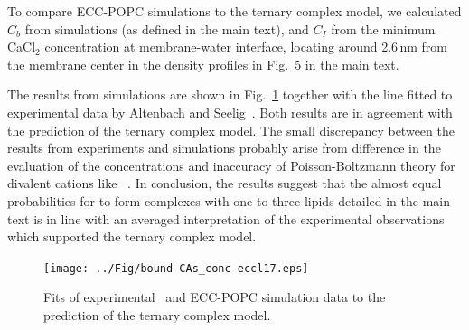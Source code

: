 \documentclass[journal=jpcbfk]{achemso}
\begin{document}
To compare ECC-POPC simulations to the ternary complex model,
we calculated $C_b$ from simulations (as defined in the main text),
and $C_I$ from the minimum CaCl$_2$ concentration at membrane-water interface,
locating around 2.6\,nm from the membrane center in
the density profiles in Fig.~5 in the main text. 

The results from simulations are shown in Fig.~\ref{fig:cacl-bind}
together with the line fitted to experimental data by Altenbach and Seelig~\cite{altenbach84}.
Both results are in agreement with the prediction of the ternary complex model.
The small discrepancy between the results from experiments and simulations probably
arise from difference in the evaluation of the concentrations and
inaccuracy of Poisson-Boltzmann theory for divalent cations like ~\cite{Andelman1995}. 
In conclusion, the results suggest that the almost equal probabilities for
 to form complexes with one to three lipids detailed in the main text is in line with an averaged interpretation of the experimental observations which supported the ternary complex model.
\newpage
\begin{figure}[!h]
  \centering
  \texttt{[image: ../Fig/bound-CAs\_conc-eccl17.eps]}
  \caption{\label{fig:cacl-bind}
    Fits of experimental~\cite{altenbach84} and ECC-POPC simulation data to
    the prediction of the ternary complex model.
    }
\end{figure}
\end{document}
